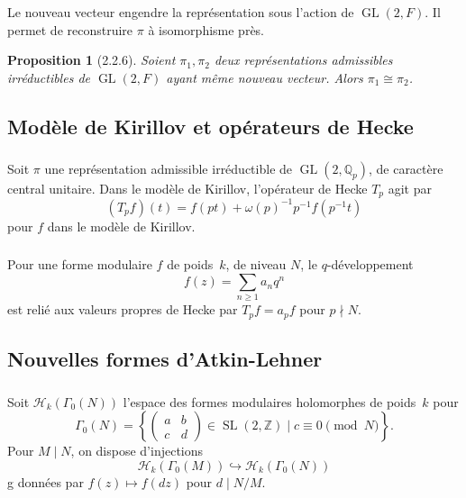 \documentclass[11pt,a4paper]{amsart}
\theoremstyle{plain}
\newtheorem{proposition}[theorem]{Proposition}
\theoremstyle{definition}
\theoremstyle{remark}
\DeclareMathOperator{\GL}{GL}
\DeclareMathOperator{\SL}{SL}
\newcommand{\ZZ}{\mathbb{Z}}
\newcommand{\QQ}{\mathbb{Q}}
\newcommand{\cH}{\mathcal{H}}
\begin{document}
\subsubsection{}
\label{sec:2.2.5}

Le nouveau vecteur engendre la repr\'esentation sous l'action de $\GL(2,F)$. Il permet de reconstruire $\pi$ \`a isomorphisme pr\`es.

\begin{proposition}[2.2.6] \label{prop:2.2.6}
Soient $\pi_1, \pi_2$ deux repr\'esentations admissibles irr\'eductibles de $\GL(2,F)$ ayant m\^eme nouveau vecteur. Alors $\pi_1 \cong \pi_2$.
\end{proposition}

\subsection{Mod\`ele de Kirillov et op\'erateurs de Hecke}

\subsubsection{}
\label{sec:2.3.1}

Soit $\pi$ une repr\'esentation admissible irr\'eductible de $\GL(2,\QQ_p)$, de caract\`ere central unitaire. Dans le mod\`ele de Kirillov, l'op\'erateur de Hecke $T_p$ agit par
\[ (T_p f)(t) = f(pt) + \omega(p)^{-1} p^{-1} f(p^{-1}t) \]
pour $f$ dans le mod\`ele de Kirillov.

\subsubsection{}
\label{sec:2.3.2}

Pour une forme modulaire $f$ de poids~$k$, de niveau $N$, le $q$-d\'eveloppement
\[ f(z) = \sum_{n \geq 1} a_n q^n \]
est reli\'e aux valeurs propres de Hecke par $T_p f = a_p f$ pour $p \nmid N$.

\subsection{Nouvelles formes d'Atkin-Lehner}

\subsubsection{}
\label{sec:2.4.1}

Soit $\cH_k(\Gamma_0(N))$ l'espace des formes modulaires holomorphes de poids~$k$ pour
\[ \Gamma_0(N) = \left\{ \begin{pmatrix} a & b \\ c & d \end{pmatrix} \in \SL(2,\ZZ) \mid c \equiv 0 \pmod{N} \right\}. \]
Pour $M \mid N$, on dispose d'injections
\[ \cH_k(\Gamma_0(M)) \hookrightarrow \cH_k(\Gamma_0(N)) \]
g donn\'ees par $f(z) \mapsto f(dz)$ pour $d \mid N/M$.
\end{document}
